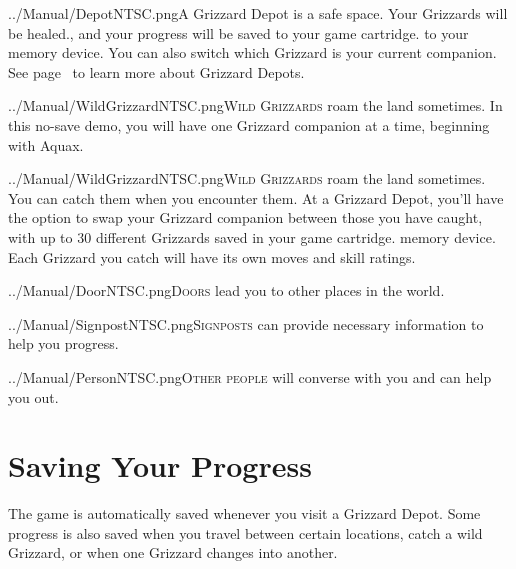 \documentclass[10pt,twocolumn,openany,article]{memoir}
\newcommand\TV{NTSC}
\newcommand\TV{PAL}
\newcommand\TV{SECAM}
\begin{document}
\lettrine[image=true,                lines=5,               findent=3pt,
nindent=3pt]{../Manual/Depot\TV.png}{A} Grizzard Depot  is a safe space.
Your  Grizzards will  be  healed\ifdefined\NOSAVE{}.{}\else{}, and  your
progress will  be saved \ifdefined\ATARIAGESAVE to  your game cartridge.
\else to your  memory device. \fi You can also  switch which Grizzard is
your  current  companion.  \fi See  page~\pageref{sec:GrizzardDepot}  to
learn more about Grizzard Depots.

\ifdefined\NOSAVE

\lettrine[image=true,                lines=5,               findent=3pt,
nindent=3pt]{../Manual/WildGrizzard\TV.png}{Wild  Grizzards}   roam  the
land sometimes. In this no-save demo, you will have one Grizzard companion at a time,
beginning with  Aquax.

\else

\lettrine[image=true,                lines=5,               findent=3pt,
nindent=3pt]{../Manual/WildGrizzard\TV.png}{Wild  Grizzards}   roam  the
land  sometimes.   You  can   catch  them   when  you   encounter  them.
At  a Grizzard  Depot,  you'll have  the option  to  swap your  Grizzard
companion  between  those you  have  caught,  with  up to  30  different
Grizzards saved  in your  \ifdefined\ATARIAGESAVE game  cartridge. \else
memory device. \fi Each Grizzard you catch will have its own moves and
skill ratings. 

\fi

\lettrine[image=true,                lines=5,               findent=3pt,
nindent=3pt]{../Manual/Door\TV.png}{Doors} lead  you to other  places in
the world.

\vspace{16pt}

\lettrine[image=true,                lines=5,               findent=3pt,
nindent=3pt]{../Manual/Signpost\TV.png}{Signposts} can provide necessary
information to help you progress.


\lettrine[image=true,                lines=5,               findent=3pt,
nindent=3pt]{../Manual/Person\TV.png}{Other  people} will  converse with
you and can help you out.



\ifdefined\NOSAVE\else

\section{Saving Your Progress}

The game  is automatically  saved whenever you  visit a  Grizzard Depot.
Some progress is  also saved when you travel  between certain locations,
catch a wild Grizzard, or when one Grizzard changes into another.
\end{document}
